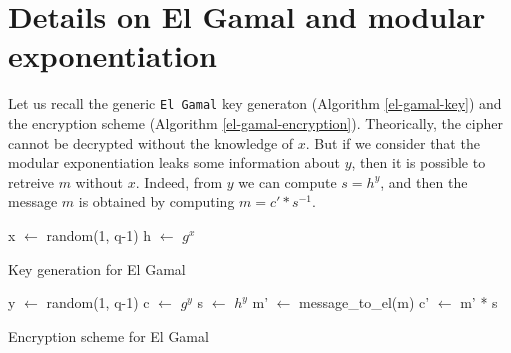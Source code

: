 \documentclass[journal]{IEEEtran}
\begin{document}
\appendices
\section{Details on El Gamal and modular exponentiation}
\label{ElGamal}
Let us recall the generic {\tt El Gamal} key generaton (Algorithm \ref{el-gamal-key})
and the encryption scheme (Algorithm \ref{el-gamal-encryption}).
Theorically, the cipher cannot be decrypted without the knowledge of $x$. But if we consider that
the modular exponentiation leaks some information about $y$, then it is possible to retreive $m$ without $x$.
Indeed, from $y$ we can compute $s = h^y$, and then the message $m$ is obtained by computing $m = c' * s^{-1}$.


\begin{algorithm}
    \SetAlgoLined %
   
    \SetSideCommentLeft 
    \SetNoFillComment

    
    
    x $\leftarrow$ random(1, q-1)\;
    h $\leftarrow$ $g^x$\;


    \bigskip

    \caption{Key generation for El Gamal}
    \label{el-gamal-key}

\end{algorithm}

\begin{algorithm}
    \SetAlgoLined %
   
    \SetSideCommentLeft 
    \SetNoFillComment

    
    
    y $\leftarrow$ random(1, q-1)\;
    c $\leftarrow$ $g^y$
    s $\leftarrow$ $h^y$\;
    m' $\leftarrow$ message\_to\_el(m)\;
    c' $\leftarrow$ m' * s\;

    \bigskip

    \caption{Encryption scheme for El Gamal}
    \label{el-gamal-encryption}

\end{algorithm}
\end{document}
